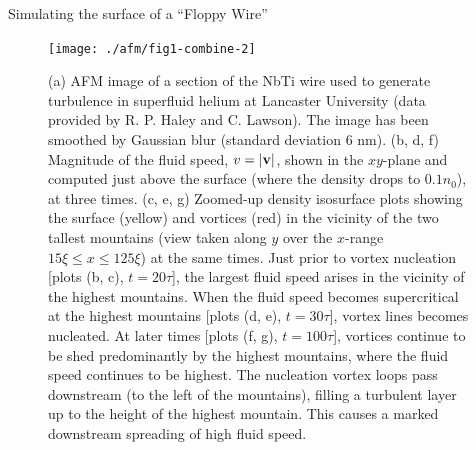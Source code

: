 \begin{chapter}{\label{cha:afm}Simulating the surface of a ``Floppy Wire''}
\begin{figure}
\centering
\texttt{[image: ./afm/fig1-combine-2]}%
\caption{(a) AFM image of a section of the NbTi wire used to generate turbulence in superfluid helium at Lancaster University (data provided by R. P. Haley and C. Lawson).  The image has been smoothed by Gaussian blur (standard deviation 6 nm).   
(b, d, f) Magnitude of the fluid speed, $v=|{\bf v}|$, shown in the $xy$-plane and computed just above the surface (where the
density drops to $0.1 n_0$), at three times.  (c, e, {g}) Zoomed-up density isosurface plots showing the surface (yellow) and vortices (red) in the vicinity of the two tallest mountains (view taken along $y$ over the $x$-range $15 \xi \leq x \leq 125 \xi$) at the same times.  Just prior to vortex nucleation [plots (b, c), $t=20 \tau$], the largest fluid speed arises in the vicinity of the highest mountains.  When the fluid speed becomes supercritical at the highest mountains [plots (d, e), $t=30 \tau$], vortex lines becomes nucleated.  At later times [plots (f, g), $t=100 \tau$], vortices continue to be shed predominantly by the highest mountains, where the fluid speed continues to be highest.  
The nucleation vortex loops pass downstream (to the left of the mountains), filling a turbulent layer up to the height of the highest mountain.  This causes a marked downstream spreading of high fluid speed. 
}
\label{fig1}
\end{figure}


\end{chapter}
